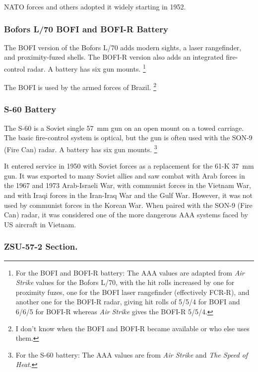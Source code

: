 \documentclass[10pt]{article}
\newcommand{\note}[1]{%
    \footnote{%
        \setlength{\parindent}{0pt}%
        \setlength{\parskip}{\smallskipamount}%
        #1
    }%
}
\begin{document}
NATO forces and others adopted it widely starting in 1952.

\subsubsection{Bofors L/70 BOFI and BOFI-R Battery}

The BOFI version of the Bofors L/70 adds modern sights, a laser rangefinder, and proximity-fuzed shells. The BOFI-R version also adds an integrated fire-control radar. A battery has six gun mounts.%
\note{
    For the BOFI and BOFI-R battery: The AAA values are adapted from \emph{Air Strike} values for the Bofors L/70, with the hit rolls increased by one for proximity fuzes, one for the BOFI laser rangefinder (effectively FCR-R), and another one for the BOFI-R radar, giving hit rolls of 5/5/4 for BOFI and 6/6/5 for BOFI-R whereas \emph{Air Strike} gives the BOFI-R 5/5/4.
}

The BOFI is used by the armed forces of Brazil.%
\note{
    I don't know when the BOFI and BOFI-R became available or who else uses them.
}

\subsubsection{S-60 Battery}

The S-60 is a Soviet single 57~mm gun on an open mount on a towed carriage. The basic fire-control system is optical, but the gun is often used with the SON-9 (Fire Can) radar. A battery has six gun mounts.%
\note{
    For the S-60 battery: The AAA values are from \emph{Air Strike} and \emph{The Speed of Heat}.
}

It entered service in 1950 with Soviet forces as a replacement for the 61-K 37~mm gun. It was exported to many Soviet allies and saw combat with Arab forces in the 1967 and 1973 Arab-Israeli War, with communist forces in the Vietnam War, and with Iraqi forces in the Iran-Iraq War and the Gulf War. However, it was not used by communist forces in the Korean War. When paired with the SON-9 (Fire Can) radar, it was considered one of the more dangerous AAA systems faced by US aircraft in Vietnam.

\subsubsection{ZSU-57-2 Section.}
\end{document}
